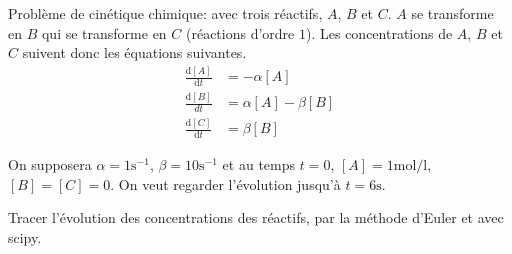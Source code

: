 \question{}
 
 Problème de cinétique chimique: avec trois réactifs, $A$, $B$ et
$C$. $A$ se transforme en $B$ qui se transforme en $C$ (réactions d'ordre $1$). 
Les concentrations de $A$, $B$ et $C$ suivent donc les équations suivantes.
\begin{align*}
  \frac{\mathrm{d}[A]}{\mathrm{d}t}&=-\alpha[A]\\
\frac{\mathrm{d}[B]}{dt}&=\alpha[A]-\beta[B]\\
\frac{\mathrm{d}[C]}{\mathrm{d}t}&=\beta[B]
\end{align*}

On supposera $\alpha=1\text{s}^{-1}$, $\beta=10\text{s}^{-1}$ et au
temps $t=0$, $[A] = 1\text{mol}/\text{l}$, $[B]=[C]=0$. On veut
regarder l'évolution
jusqu'à $t=6\text{s}$.

\question{}
Tracer l'évolution des concentrations des réactifs, par la méthode d'Euler et avec scipy.